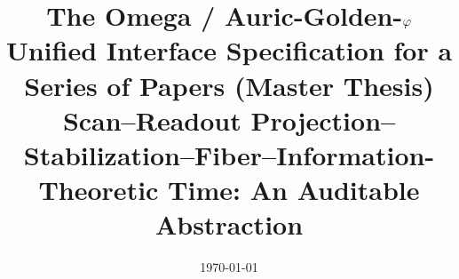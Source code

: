 \documentclass[11pt,letterpaper]{article}
\title{The Omega / Auric-Golden-$\varphi$ Unified Interface Specification for a Series of Papers (Master Thesis)\\\large Scan--Readout Projection--Stabilization--Fiber--Information-Theoretic Time: An Auditable Abstraction}
\author{}
\date{\today}
\begin{document}
\maketitle










\FloatBarrier
\appendix


\end{document}
